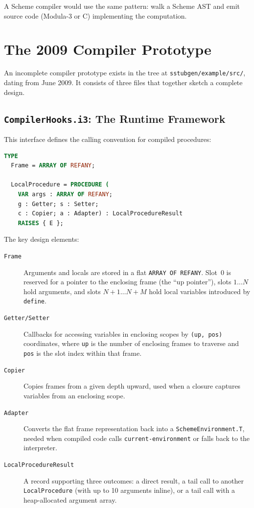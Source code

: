 \documentclass[12pt]{report}
\begin{document}
A Scheme compiler would use the same pattern: walk a Scheme AST
and emit source code (Modula-3 or C) implementing the computation.

\section{The 2009 Compiler Prototype}
\label{sec:prior}

An incomplete compiler prototype exists in the tree at
\texttt{sstubgen/example/src/}, dating from June 2009.  It consists
of three files that together sketch a complete design.

\subsection{\texttt{CompilerHooks.i3}: The Runtime Framework}

This interface defines the calling convention for compiled procedures:

\begin{lstlisting}[language=Modula3]
TYPE
  Frame = ARRAY OF REFANY;

  LocalProcedure = PROCEDURE (
    VAR args : ARRAY OF REFANY;
    g : Getter; s : Setter;
    c : Copier; a : Adapter) : LocalProcedureResult
    RAISES { E };
\end{lstlisting}

The key design elements:

\begin{description}
\item[\texttt{Frame}] Arguments and locals are stored in a flat
  \texttt{ARRAY OF REFANY}.  Slot~0 is reserved for a pointer to
  the enclosing frame (the ``up pointer''), slots $1 \ldots N$ hold
  arguments, and slots $N{+}1 \ldots N{+}M$ hold local variables
  introduced by \texttt{define}.

\item[\texttt{Getter/Setter}] Callbacks for accessing variables in
  enclosing scopes by \texttt{(up, pos)} coordinates, where
  \texttt{up} is the number of enclosing frames to traverse and
  \texttt{pos} is the slot index within that frame.

\item[\texttt{Copier}] Copies frames from a given depth upward,
  used when a closure captures variables from an enclosing scope.

\item[\texttt{Adapter}] Converts the flat frame representation
  back into a \texttt{SchemeEnvironment.T}, needed when compiled
  code calls \texttt{current-environment} or falls back to the
  interpreter.

\item[\texttt{LocalProcedureResult}] A record supporting three
  outcomes: a direct result, a tail call to another
  \texttt{LocalProcedure} (with up to 10 arguments inline), or
  a tail call with a heap-allocated argument array.
\end{description}
\end{document}
